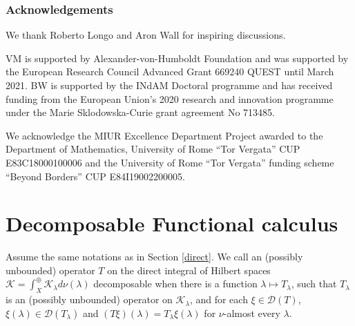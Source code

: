 \documentclass[12pt]{article}
\def\D{{\mathcal D}}
\def\K{{\mathcal K}}
\def\l{\lambda}
\theoremstyle{remark}
\begin{document}
\subsubsection*{Acknowledgements}
We thank Roberto Longo and Aron Wall for inspiring discussions.

VM is supported by Alexander-von-Humboldt Foundation and was supported  by the European Research Council Advanced Grant 669240 QUEST until March 2021. BW is supported by the INdAM Doctoral programme and has received funding from the European Union's 2020 research and innovation programme under the Marie Sklodowska-Curie grant agreement No 713485.

We acknowledge the MIUR Excellence Department Project awarded to
the Department of Mathematics, University of Rome ``Tor Vergata'' CUP E83C18000100006 and the University of
Rome ``Tor Vergata'' funding scheme ``Beyond Borders'' CUP E84I19002200005.



\appendix
\section{Decomposable Functional calculus}\label{appendix}

	Assume the same notations as in Section \ref{direct}. We call an (possibly unbounded) operator $T$ on the direct integral of Hilbert spaces $\K=\int^\oplus_X \K_\l d\nu(\l)$ decomposable when there is a function $\l \mapsto T_\l$, such that $T_\l$ is an (possibly unbounded) operator on $\K_\l$, and for each $\xi \in \D(T)$, $\xi(\l) \in \D(T_\l)$ and $(T\xi)(\l)=T_\l\xi(\l)$ for $\nu$-almost every $\l$. 
		
\end{document}
